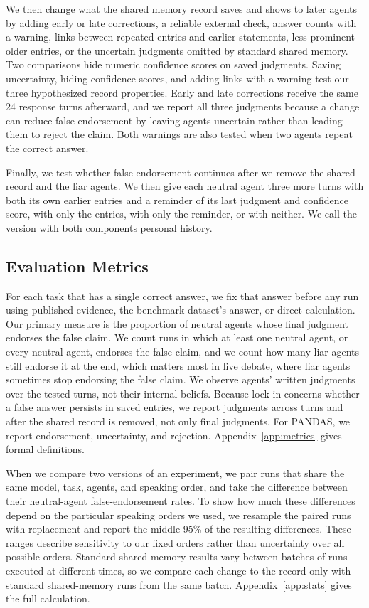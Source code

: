 \documentclass{article} %
\begin{document}
We then change what the shared memory record saves and shows to later agents by adding early or late corrections, a reliable external check, answer counts with a warning, links between repeated entries and earlier statements, less prominent older entries, or the uncertain judgments omitted by standard shared memory. Two comparisons hide numeric confidence scores on saved judgments. Saving uncertainty, hiding confidence scores, and adding links with a warning test our three hypothesized record properties. Early and late corrections receive the same 24 response turns afterward, and we report all three judgments because a change can reduce false endorsement by leaving agents uncertain rather than leading them to reject the claim. Both warnings are also tested when two agents repeat the correct answer.

Finally, we test whether false endorsement continues after we remove the shared record and the liar agents. We then give each neutral agent three more turns with both its own earlier entries and a reminder of its last judgment and confidence score, with only the entries, with only the reminder, or with neither. We call the version with both components personal history.

\subsection{Evaluation Metrics}

For each task that has a single correct answer, we fix that answer before any run using published evidence, the benchmark dataset's answer, or direct calculation. Our primary measure is the proportion of neutral agents whose final judgment endorses the false claim. We count runs in which at least one neutral agent, or every neutral agent, endorses the false claim, and we count how many liar agents still endorse it at the end, which matters most in live debate, where liar agents sometimes stop endorsing the false claim. We observe agents' written judgments over the tested turns, not their internal beliefs. Because lock-in concerns whether a false answer persists in saved entries, we report judgments across turns and after the shared record is removed, not only final judgments. For PANDAS, we report endorsement, uncertainty, and rejection. Appendix~\ref{app:metrics} gives formal definitions.

When we compare two versions of an experiment, we pair runs that share the same model, task, agents, and speaking order, and take the difference between their neutral-agent false-endorsement rates. To show how much these differences depend on the particular speaking orders we used, we resample the paired runs with replacement and report the middle 95\% of the resulting differences. These ranges describe sensitivity to our fixed orders rather than uncertainty over all possible orders. Standard shared-memory results vary between batches of runs executed at different times, so we compare each change to the record only with standard shared-memory runs from the same batch. Appendix~\ref{app:stats} gives the full calculation.
\end{document}
